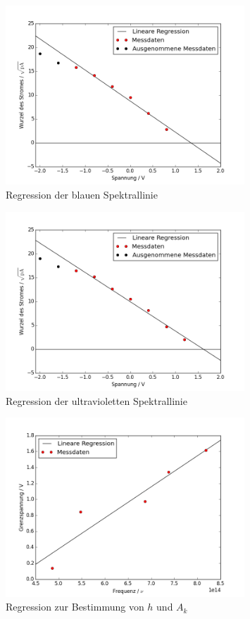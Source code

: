 \begin{figure}[h!]
	\centering
	\includegraphics[width=0.8\textwidth]{build/regression_Farbe:3.png}
	\caption{Regression der blauen Spektrallinie}
	\label{fig:regression_blau}
\end{figure}

\begin{figure}[h!]
	\centering
	\includegraphics[width=0.8\textwidth]{build/regression_Farbe:4.png}
	\caption{Regression der ultravioletten Spektrallinie}
	\label{fig:regression_uv}
\end{figure}

\begin{figure}[h!]
\centering
\includegraphics[width=0.8\textwidth]{build/regression_aufgabe2.png}
\caption{Regression zur Bestimmung von $h$ und $A_k$}
\label{fig:regression2}
\end{figure}


